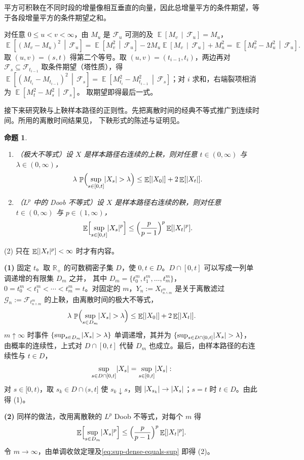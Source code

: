 \documentclass[UTF8,11pt,a4paper,oneside,fontset=fandol]{ctexrep}
\makeatletter
\numberwithin{equation}{section}
\theoremstyle{zhthm}
\newtheorem{proposition}[theorem]{命题}
\renewenvironment{proof}[1][\proofname]{\par
  \pushQED{\qed}%
  \normalfont\topsep6\p@\@plus6\p@\relax
  \trivlist
  \item[\hskip\labelsep\bfseries#1\hspace{0.5em}]\ignorespaces
}{%
  \popQED\endtrivlist\@endpefalse
}
\renewcommand{\proofname}{证明}
\newcommand{\R}{\mathbb{R}}
\newcommand{\F}{\mathcal{F}}
\newcommand{\G}{\mathcal{G}}
\DeclareMathOperator{\Prob}{\mathbb{P}}
\DeclareMathOperator{\E}{\mathbb{E}}
\newcommand{\Econd}[2]{%
  \E\!\left[#1\,\middle|\,#2\right]}
\DeclarePairedDelimiter{\abs}{\lvert}{\rvert}
\makeatother
\begin{document}
平方可积鞅在不同时段的增量像相互垂直的向量，因此总增量平方的条件期望，等于各段增量平方的条件期望之和。

\begin{proof}
对任意 $0\le u<v<\infty$，由 $M_u$ 是 $\F_u$ 可测的及 $\Econd{M_v}{\F_u}=M_u$，
\[
  \Econd{(M_v-M_u)^2}{\F_u}=\Econd{M_v^2}{\F_u}-2M_u\Econd{M_v}{\F_u}+M_u^2=\Econd{M_v^2-M_u^2}{\F_u}.
\]
取 $(u,v)=(s,t)$ 得第二个等号。取 $(u,v)=(t_{i-1},t_i)$，两边再对 $\F_s\subseteq\F_{t_{i-1}}$ 取条件期望（塔性质），得
$\Econd{(M_{t_i}-M_{t_{i-1}})^2}{\F_s}=\Econd{M_{t_i}^2-M_{t_{i-1}}^2}{\F_s}$；对 $i$ 求和，右端裂项相消为 $\Econd{M_t^2-M_s^2}{\F_s}$。
取期望即得最后一式。
\end{proof}

接下来研究鞅与上鞅样本路径的正则性。先把离散时间的经典不等式推广到连续时间。所用的离散时间结果见\cite[附录 A2]{LeGall2016}，
下鞅形式的陈述与证明见\cite[\S4.2、\S4.4]{Durrett2019}。

\begin{proposition}
\label{prop:continuous-maximal-inequalities}
\begin{enumerate}[label=(\arabic*)]
  \item （极大不等式）设 $X$ 是样本路径右连续的上鞅，则对任意 $t\in(0,\infty)$ 与 $\lambda\in(0,\infty)$，
    \[
      \lambda\,\Prob\Bigl(\sup_{s\in[0,t]}\abs{X_s}>\lambda\Bigr)\le\E[\abs{X_0}]+2\E[\abs{X_t}].
    \]
  \item （$L^p$ 中的 Doob 不等式）设 $X$ 是样本路径右连续的鞅，则对任意 $t\in(0,\infty)$ 与 $p\in(1,\infty)$，
    \[
      \E\Bigl[\sup_{s\in[0,t]}\abs{X_s}^p\Bigr]\le\Bigl(\frac{p}{p-1}\Bigr)^p\E[\abs{X_t}^p].
    \]
\end{enumerate}
\end{proposition}

(2) 只在 $\E[\abs{X_t}^p]<\infty$ 时才有内容。

\begin{proof}
\textbf{(1)} 固定 $t$。取 $\R_+$ 的可数稠密子集 $D$，使 $0,t\in D$。$D\cap[0,t]$ 可以写成一列单调递增的有限集 $D_m$ 之并，
其中 $D_m=\{t^m_0,t^m_1,\ldots,t^m_m\}$，$0=t^m_0<t^m_1<\cdots<t^m_m=t$。对固定的 $m$，$Y_n:=X_{t^m_{n\wedge m}}$ 是关于离散滤过
$\G_n:=\F_{t^m_{n\wedge m}}$ 的上鞅，由离散时间的极大不等式\cite[附录 A2]{LeGall2016}，
\[
  \lambda\,\Prob\Bigl(\sup_{s\in D_m}\abs{X_s}>\lambda\Bigr)\le\E[\abs{X_0}]+2\E[\abs{X_t}].
\]
$m\uparrow\infty$ 时事件 $\{\sup_{s\in D_m}\abs{X_s}>\lambda\}$ 单调递增，其并为 $\{\sup_{s\in D\cap[0,t]}\abs{X_s}>\lambda\}$，
由概率的连续性，上式对 $D\cap[0,t]$ 代替 $D_m$ 也成立。最后，由样本路径的右连续性与 $t\in D$，
\begin{equation}
  \label{eq:sup-dense-equals-sup}
  \sup_{s\in D\cap[0,t]}\abs{X_s}=\sup_{s\in[0,t]}\abs{X_s}:
\end{equation}
对 $s\in[0,t)$，取 $s_k\in D\cap(s,t]$ 使 $s_k\downarrow s$，则 $\abs{X_{s_k}}\to\abs{X_s}$；$s=t$ 时 $t\in D$。由此得 (1)。

\textbf{(2)} 同样的做法，改用离散鞅的 $L^p$ Doob 不等式\cite[附录 A2]{LeGall2016}，对每个 $m$ 得
\[
  \E\Bigl[\sup_{s\in D_m}\abs{X_s}^p\Bigr]\le\Bigl(\frac{p}{p-1}\Bigr)^p\E[\abs{X_t}^p].
\]
令 $m\to\infty$，由单调收敛定理及\cref{eq:sup-dense-equals-sup} 即得 (2)。
\end{proof}
\end{document}
